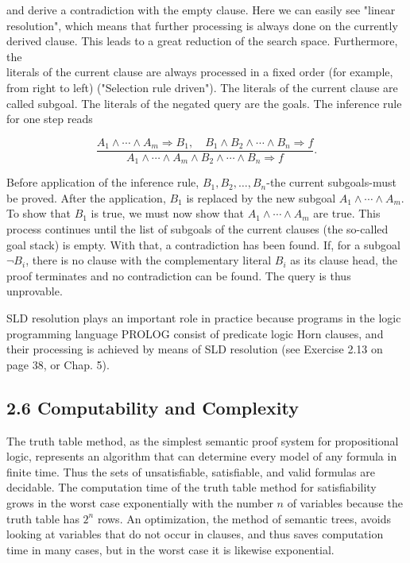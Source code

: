 \documentclass[10pt]{article}
\begin{document}
and derive a contradiction with the empty clause. Here we can easily see "linear resolution", which means that further processing is always done on the currently derived clause. This leads to a great reduction of the search space. Furthermore, the\\
literals of the current clause are always processed in a fixed order (for example, from right to left) ("Selection rule driven"). The literals of the current clause are called subgoal. The literals of the negated query are the goals. The inference rule for one step reads

$$
\frac{A_{1} \wedge \cdots \wedge A_{m} \Rightarrow B_{1}, \quad B_{1} \wedge B_{2} \wedge \cdots \wedge B_{n} \Rightarrow f}{A_{1} \wedge \cdots \wedge A_{m} \wedge B_{2} \wedge \cdots \wedge B_{n} \Rightarrow f} .
$$

Before application of the inference rule, $B_{1}, B_{2}, \ldots, B_{n}$-the current subgoals-must be proved. After the application, $B_{1}$ is replaced by the new subgoal $A_{1} \wedge \cdots \wedge A_{m}$. To show that $B_{1}$ is true, we must now show that $A_{1} \wedge \cdots \wedge A_{m}$ are true. This process continues until the list of subgoals of the current clauses (the so-called goal stack) is empty. With that, a contradiction has been found. If, for a subgoal $\neg B_{i}$, there is no clause with the complementary literal $B_{i}$ as its clause head, the proof terminates and no contradiction can be found. The query is thus unprovable.

SLD resolution plays an important role in practice because programs in the logic programming language PROLOG consist of predicate logic Horn clauses, and their processing is achieved by means of SLD resolution (see Exercise 2.13 on page 38, or Chap. 5).

\subsection*{2.6 Computability and Complexity}
The truth table method, as the simplest semantic proof system for propositional logic, represents an algorithm that can determine every model of any formula in finite time. Thus the sets of unsatisfiable, satisfiable, and valid formulas are decidable. The computation time of the truth table method for satisfiability grows in the worst case exponentially with the number $n$ of variables because the truth table has $2^{n}$ rows. An optimization, the method of semantic trees, avoids looking at variables that do not occur in clauses, and thus saves computation time in many cases, but in the worst case it is likewise exponential.
\end{document}
